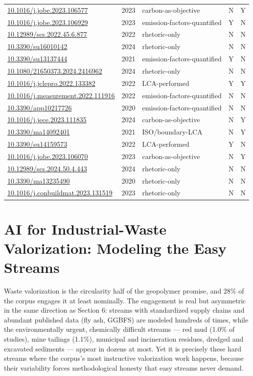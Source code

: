 \documentclass[pdflatex,sn-basic]{sn-jnl}
\begin{document}
{\begin{longtable}{p{}lp{}lp{}}
\url{10.1016/j.jobe.2023.106577} & 2023 & carbon-as-objective & N & Y \\
\url{10.1016/j.jobe.2023.106929} & 2023 & emission-factors-quantified & Y & N \\
\url{10.12989/scs.2022.45.6.877} & 2022 & rhetoric-only & N & N \\
\url{10.3390/su16010142} & 2024 & rhetoric-only & N & N \\
\url{10.3390/su13137444} & 2021 & emission-factors-quantified & Y & N \\
\url{10.1080/21650373.2024.2416962} & 2024 & rhetoric-only & N & N \\
\url{10.1016/j.jclepro.2022.133382} & 2022 & LCA-performed & Y & Y \\
\url{10.1016/j.measurement.2022.111916} & 2022 & emission-factors-quantified & N & N \\
\url{10.3390/app10217726} & 2020 & emission-factors-quantified & N & N \\
\url{10.1016/j.jece.2023.111835} & 2024 & carbon-as-objective & N & Y \\
\url{10.3390/ma14092401} & 2021 & ISO/boundary-LCA & N & Y \\
\url{10.3390/su14159573} & 2022 & LCA-performed & Y & N \\
\url{10.1016/j.jobe.2023.106070} & 2023 & carbon-as-objective & N & Y \\
\url{10.12989/scs.2024.50.4.443} & 2024 & rhetoric-only & N & N \\
\url{10.3390/ma13235490} & 2020 & rhetoric-only & N & N \\
\url{10.1016/j.conbuildmat.2023.131519} & 2023 & rhetoric-only & N & N \\
\end{longtable}}

\section{AI for Industrial-Waste Valorization: Modeling the Easy Streams}

Waste valorization is the circularity half of the geopolymer promise, and 28\% of the corpus engages it at least nominally. The engagement is real but asymmetric in the same direction as Section 6: streams with standardized supply chains and abundant published data (fly ash, GGBFS) are modeled hundreds of times, while the environmentally urgent, chemically difficult streams --- red mud (1.0\% of studies), mine tailings (1.1\%), municipal and incineration residues, dredged and excavated sediments --- appear in dozens at most. Yet it is precisely these hard streams where the corpus's most instructive valorization work happens, because their variability forces methodological honesty that easy streams never demand.
\end{document}
